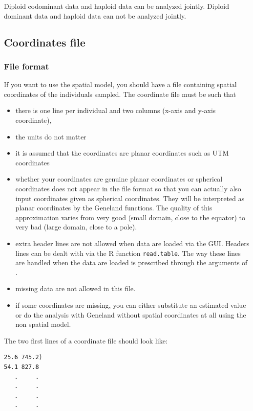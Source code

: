 \documentclass[a4paper,10pt]{article}
\begin{document}
Diploid codominant data and haploid  data can be analyzed jointly.
Diploid dominant data and haploid data can not be analyzed jointly.

\subsection{Coordinates file}


\subsubsection{File format}

If you want to use the spatial model, you should  have a file containing spatial coordinates of the individuals sampled.
The coordinate  file must be such that  
\begin{itemize}
\item there is one line per individual and two columns (x-axis and y-axis coordinate), 
\item the units do not matter
\item it is assumed that the coordinates are planar coordinates such as 
UTM coordinates 
\item whether your coordinates are genuine planar coordinates or spherical coordinates does not 
appear in the file  format so that you can actually 
also input coordinates given as spherical coordinates. 
They will be interpreted as planar coordinates by 
the {\sc Geneland} functions. The quality of this approximation varies from very good (small domain, close to the equator) 
to very bad (large domain, close to a pole). 
\item extra header lines are not allowed when data are loaded via the GUI. 
Headers lines can be dealt with via the R function \texttt{read.table}. 
 The way these lines are handled when the data are loaded is prescribed 
through the arguments of .
\item missing data are not allowed in this file. 
\item if some coordinates are missing, you can either substitute an estimated value 
or do the analysis with {\sc Geneland} without spatial coordinates at all using the non spatial model. 
\end{itemize}


The two first lines  of a coordinate file should look like:\\



\medskip
\begin{verbatim}
25.6 745.2)
54.1 827.8
   .     .
   .     .
   .     .
   .     .
\end{verbatim}
\end{document}
